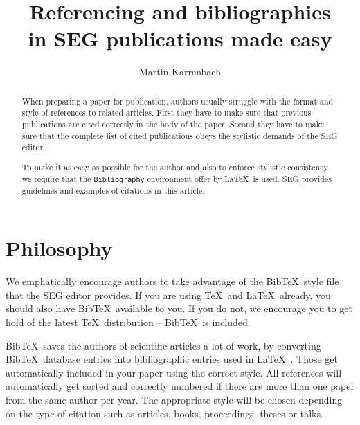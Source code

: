 %
%
%
\def\BibTeX{\rm B{\sc ib}\TeX}



\title{Referencing and bibliographies \\ in SEG publications made easy}
\author{Martin Karrenbach}
\address{Stanford Exploration Project, 366 Mitchell, Stanford, CA 94305, U.S.A.}
\maketitle

\begin{abstract}
When preparing a paper for publication, authors usually struggle with 
the format and style of references to related articles.
First they have to make sure that previous publications are cited correctly
in the body of the paper. Second they have to make sure that the complete
list of cited publications obeys the stylistic demands of the SEG
editor. 

To make it as easy as possible for the author and also to enforce 
stylistic consistency we require that the {\tt Bibliography} environment
offer by \LaTeX\  is used.  SEG provides guidelines and examples 
of citations in this article.
\end{abstract}

\section{Philosophy}
We emphatically encourage authors to take advantage of the \BibTeX\ 
style file that the SEG editor provides. If you are using \TeX\  and 
\LaTeX\  already, you should also have \BibTeX\  available to you.
If you do not, we encourage you to get hold of the latest \TeX\ 
distribution -- \BibTeX\  is included.

\BibTeX\  saves the authors of scientific articles a lot of work,
by converting \BibTeX\  database entries into bibliographic entries
used in  \LaTeX\ .
Those get automatically included in your paper using the correct style.
All references will automatically get sorted and correctly numbered if
there are more than one paper from the same author per year.
The appropriate style will be chosen depending on the type of citation
such as articles, books, proceedings, theses or talks.

